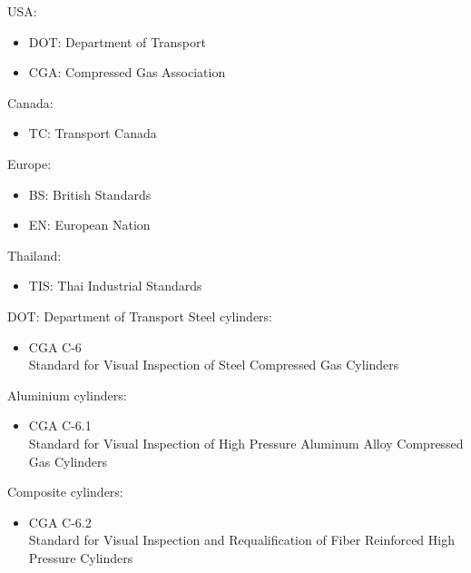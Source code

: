 \documentclass[aspectratio=1610,english,12pt]{beamer}
\begin{document}
\begin{frame}{\insertsubsection}
	USA:
	\begin{itemize}
		\item DOT: Department of Transport
		\item CGA: Compressed Gas Association
	\end{itemize}

	Canada:
	\begin{itemize}
		\item TC: Transport Canada
	\end{itemize}

	Europe:
	\begin{itemize}
		\item BS: British Standards
		\item EN: European Nation
	\end{itemize}

	Thailand:
	\begin{itemize}
		\item TIS: Thai Industrial Standards
	\end{itemize}
\end{frame}

\begin{frame}{DOT: Department of Transport}
	Steel cylinders:
	\begin{itemize}
		\item CGA C-6\\Standard for Visual Inspection of Steel Compressed Gas Cylinders
	\end{itemize}
	Aluminium cylinders:
	\begin{itemize}
		\item CGA C-6.1\\Standard for Visual Inspection of High Pressure Aluminum Alloy Compressed Gas Cylinders
	\end{itemize}
	Composite cylinders:
	\begin{itemize}
		\item CGA C-6.2\\Standard for Visual Inspection and Requalification of Fiber Reinforced High Pressure Cylinders
	\end{itemize}
\end{frame}
\end{document}
